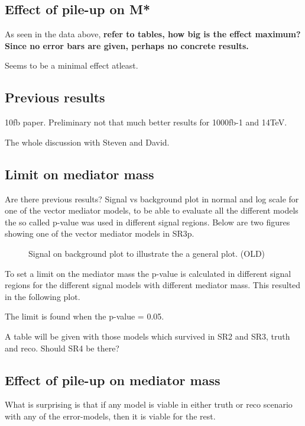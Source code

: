 \newpage

\subsection{Effect of pile-up on M*}\label{subsec:pilem*}
As seen in the data above, \textbf{refer to tables, how big is the effect maximum? Since no error bars are given, perhaps no concrete results.}

Seems to be a minimal effect atleast.

\subsection{Previous results}
10fb paper.
Preliminary not that much better results for 1000fb-1 and 14TeV.

The whole discussion with Steven and David.


\subsection{Limit on mediator mass}\label{sec:res:subsec:Mm}
Are there previous results?
Signal vs background plot in normal and log scale for one of the vector mediator models, to be able to evaluate all the different models the so called p-value was used in different signal regions. Below are two figures showing one of the vector mediator models in SR3p.
 \begin{figure}[H] %
    \hfill
    \caption{Signal on background plot to illustrate the a general plot. (OLD) }
    \label{fig:sigback}
  \end{figure}

To set a limit on the mediator mass the p-value is calculated in different signal regions for the different signal models with different mediator mass. This resulted in the following plot.

The limit is found when the p-value = 0.05.

A table will be given with those models which survived in SR2 and SR3, truth and reco. Should SR4 be there?


\subsection{Effect of pile-up on mediator mass}\label{subsec:pilemm}
What is surprising is that if any model is viable in either truth or reco scenario with any of the error-models, then it is viable for the rest. 



